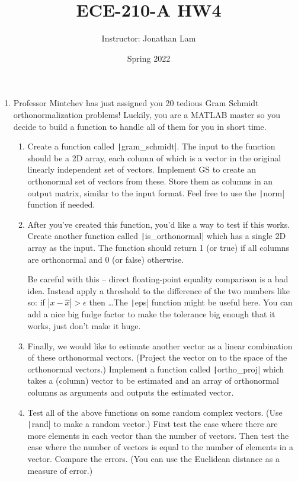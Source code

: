 \documentclass{article}
\title{ECE-210-A HW4}
\author{Instructor: Jonathan Lam}
\date{Spring 2022}
\begin{document}
\maketitle

\begin{enumerate}
\item Professor Mintchev has just assigned you 20 tedious Gram Schmidt orthonormalization problems! Luckily, you are a MATLAB master so you decide to build a function to handle all of them for you in short time.
  
  \begin{enumerate}
  \item Create a function called \texttt|gram_schmidt|. The input to the function should be a 2D array, each column of which is a vector in the original linearly independent set of vectors. Implement GS to create an orthonormal set of vectors from these. Store them as columns in an output matrix, similar to the input format. Feel free to use the \texttt|norm| function if needed.
    
  \item After you've created this function, you'd like a way to test if this works. Create another function called \texttt|is_orthonormal| which has a single 2D array as the input. The function should return 1 (or true) if all columns are orthonormal and 0 (or false) otherwise.
    
    Be careful with this -- direct floating-point equality comparison is a bad idea. Instead apply a threshold to the difference of the two numbers like so: if $|x-\hat{x}|>\epsilon$ then \dots The \texttt|eps| function might be useful here. You can add a nice big fudge factor to make the tolerance big enough that it works, just don't make it huge.
    
  \item Finally, we would like to estimate another vector as a linear combination of these orthonormal vectors. (Project the vector on to the space of the orthonormal vectors.) Implement a function called \texttt|ortho_proj| which takes a (column) vector to be estimated and an array of orthonormal columns as arguments and outputs the estimated vector.
    
  \item Test all of the above functions on some random complex vectors. (Use \texttt|rand| to make a random vector.) First test the case where there are more elements in each vector than the number of vectors. Then test the case where the number of vectors is equal to the number of elements in a vector. Compare the errors. (You can use the Euclidean distance as a measure of error.)


\end{enumerate}
\end{enumerate}
\end{document}
